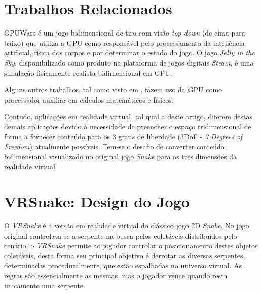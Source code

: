 \documentclass[conference]{IEEEtran}
\begin{document}
\section{Trabalhos Relacionados} \label{sec:relatedworks}

GPUWars \cite{GPGPUWars} é um jogo bidimensional de tiro com visão \textit{top-down} (de cima para baixo) que utiliza a GPU como responsável pelo processamento da inteliência artificial, física dos corpos e por determinar o estado do jogo. O jogo \textit{Jelly in the Sky}, disponibilizado como produto na plataforma de jogos digitais \textit{Steam}, é uma simulação fisicamente realista bidimensional em GPU.

Alguns outros trabalhos, tal como visto em \cite{Joselli:2010:AGL:1658866.1658869}, fazem uso da GPU como processador auxiliar em cálculos matemáticos e físicos. 

Contudo, aplicações em realidade virtual, tal qual a deste artigo, diferem destas demais aplicações devido à necessidade de preencher o espaço tridimensional de forma a fornecer conteúdo para os 3 graus de liberdade (3DoF - \textit{3 Degrees of Freedom}) atualmente possíveis. Tem-se o desafio de converter conteúdo bidimensional visualizado no original jogo \textit{Snake} para as três dimensões da realidade virtual.

\section{VRSnake: Design do Jogo} \label{sec:vrsnake}
O \textit{VRSnake} é a versão em realidade virtual do clássico jogo 2D \textit{Snake}. No jogo original controlava-se a serpente na busca pelos coletáveis distribuídos pelo cenário, o \textit{VRSnake} permite ao jogador controlar o posicionamento destes objetos coletáveis, desta forma seu principal objetivo é derrotar as diversas serpentes, determinadas proceduralmente, que estão espalhadas no universo virtual. As regras são essencialmente as mesmas, mas o jogador vence quando resta unicamente uma serpente.

\end{document}
